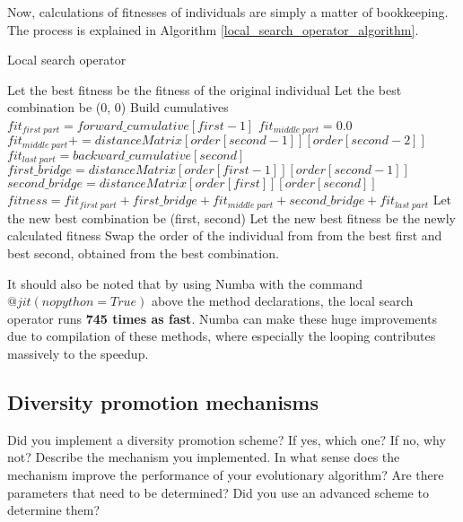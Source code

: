 \documentclass[a4paper,10pt]{article}
\newcommand{\ReplaceMe}[1]{{\color{blue}#1}}
\begin{document}
Now, calculations of fitnesses of individuals are simply a matter of bookkeeping. The process is explained in Algorithm \ref{local_search_operator_algorithm}.


\begin{algorithm}
\caption{Local search operator}\label{local_search_operator_algorithm}
\begin{algorithmic}
\State Let the best fitness be the fitness of the original individual
\State Let the best combination be (0, 0)
\State Build cumulatives
\State $fit_{first \; part} = forward\_cumulative[first - 1]$
\State $fit_{middle \; part} = 0.0$
\State $fit_{middle \; part} \mathrel{{+}{=}} distanceMatrix[order[second-1]][order[second-2]]$
\State $fit_{last \; part} = backward\_cumulative[second]$
\State $first\_bridge = distanceMatrix[order[first-1]][order[second-1]]$
\State $second\_bridge = distanceMatrix[order[first]][order[second]]$
\State $fitness = fit_{first \; part} + first\_bridge + fit_{middle \; part} + second\_bridge + fit_{last \; part}$
\State Let the new best combination be (first, second)
\State Let the new best fitness be the newly calculated fitness
\EndIf
\EndFor
\EndFor
\State Swap the order of the individual from from the best first and best second, obtained from the best combination.
\end{algorithmic}
\end{algorithm}

It should also be noted that by using Numba with the command $@jit(nopython=True)$ above the method declarations, the local search operator runs \textbf{745 times as fast}. Numba can make these huge improvements due to compilation of these methods, where especially the looping contributes massively to the speedup.


\subsection{Diversity promotion mechanisms}
\label{diversity_promotion}
\ReplaceMe{Did you implement a diversity promotion scheme? If yes, which one? If no, why not? Describe the mechanism you implemented. In what sense does the mechanism improve the performance of your evolutionary algorithm? Are there parameters that need to be determined? Did you use an advanced scheme to determine them?}
\end{document}
